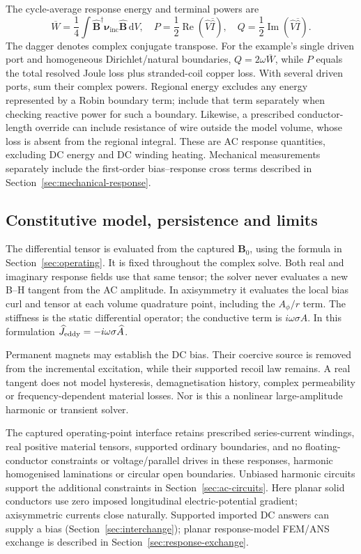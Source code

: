 The cycle-average response energy and terminal powers are
\[
 \overline W=\frac14\int
 \widehat{\mathbf B}^{\dagger}\boldsymbol\nu_{\mathrm{inc}}
 \widehat{\mathbf B}\,\mathrm dV,\quad
 P=\frac12\operatorname{Re}(\widehat V\overline{\widehat I}),\quad
 Q=\frac12\operatorname{Im}(\widehat V\overline{\widehat I}).
\]
The dagger denotes complex conjugate transpose. For the example's single
driven port and homogeneous Dirichlet/natural boundaries,
$Q=2\omega\overline W$, while $P$ equals the total resolved Joule loss plus
stranded-coil copper loss. With several driven ports, sum their complex powers.
Regional energy excludes any energy represented by a Robin boundary term;
include that term separately when checking reactive power for such a boundary.
Likewise, a prescribed conductor-length override can include resistance of wire
outside the model volume, whose loss is absent from the regional integral.
These are AC response quantities, excluding DC
energy and DC winding heating. Mechanical measurements separately include the
first-order bias--response cross terms described in Section~\ref{sec:mechanical-response}.

\subsection{Constitutive model, persistence and limits}
The differential tensor is evaluated from the captured $\mathbf B_0$, using
the formula in Section~\ref{sec:operating}. It is fixed throughout the complex
solve. Both real and imaginary response fields use that same tensor; the
solver never evaluates a new B--H tangent from the AC amplitude. In axisymmetry
it evaluates the local bias curl and tensor at each volume quadrature point,
including the $A_\phi/r$ term. The stiffness is the static differential
operator; the conductive term is $i\omega\sigma A$. In this formulation
$\widehat J_{\rm eddy}=-i\omega\sigma\widehat A$.

Permanent magnets may establish the DC bias. Their coercive source is removed
from the incremental excitation, while their supported recoil law remains.
A real tangent does not model hysteresis, demagnetisation history, complex
permeability or frequency-dependent material losses. Nor is this a nonlinear
large-amplitude harmonic or transient solver.

The captured operating-point interface retains prescribed series-current
windings, real positive material tensors, supported ordinary boundaries, and
no floating-conductor constraints or voltage/parallel drives in these responses,
harmonic homogenised laminations or circular open boundaries. Unbiased harmonic circuits support the
additional constraints in Section~\ref{sec:ac-circuits}. Here planar solid conductors use zero imposed
longitudinal electric-potential gradient; axisymmetric currents close naturally.
Supported imported DC answers can supply a bias (Section~\ref{sec:interchange});
planar response-model FEM/ANS exchange is described in
Section~\ref{sec:response-exchange}.

